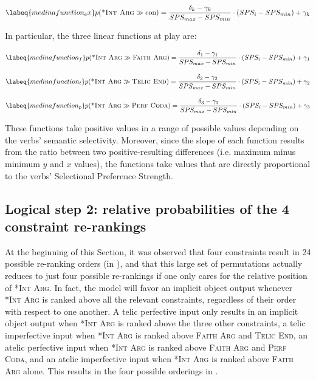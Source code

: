 \begin{equation} \labeq{medinafunction_ex}
p(\textsc{*Int Arg} \gg \textrm{con}) = \frac{\delta_k - \gamma_k}{SPS_{max} - SPS_{min}} \cdot ({SPS_{i} - SPS_{min}}) + \gamma_k
\end{equation}

In particular, the three linear functions at play are:

\begin{equation} \labeq{medinafunction_f}
p(\textsc{*Int Arg} \gg \textsc{Faith Arg}) = \frac{\delta_1 - \gamma_1}{SPS_{max} - SPS_{min}} \cdot ({SPS_{i} - SPS_{min}}) + \gamma_1
\end{equation}

\begin{equation} \labeq{medinafunction_t}
p(\textsc{*Int Arg} \gg \textsc{Telic End}) = \frac{\delta_2 - \gamma_2}{SPS_{max} - SPS_{min}} \cdot ({SPS_{i} - SPS_{min}}) + \gamma_2
\end{equation}

\begin{equation} \labeq{medinafunction_p}
p(\textsc{*Int Arg} \gg \textsc{Perf Coda}) = \frac{\delta_3 - \gamma_3}{SPS_{max} - SPS_{min}} \cdot ({SPS_{i} - SPS_{min}}) + \gamma_3
\end{equation}

These functions take positive values in a range of possible values depending on the verbs' semantic selectivity. Moreover, since the slope of each function results from the ratio between two positive-resulting differences (i.e. maximum minus minimum $y$ and $x$ values), the functions take values that are directly proportional to the verbs' Selectional Preference Strength.

\subsection{Logical step 2: relative probabilities of the 4 constraint re-rankings} 
At the beginning of this Section, it was observed that four constraints result in 24 possible re-ranking orders (in ), and that this large set of permutations actually reduces to just four possible re-rankings if one only cares for the relative position of \textsc{*Int Arg}. In fact, the model will favor an implicit object output whenever \textsc{*Int Arg} is ranked above all the relevant constraints, regardless of their order with respect to one another. A telic perfective input only results in an implicit object output when \textsc{*Int Arg} is ranked above the three other constraints, a telic imperfective input when \textsc{*Int Arg} is ranked above \textsc{Faith Arg} and \textsc{Telic End}, an atelic perfective input when \textsc{*Int Arg} is ranked above \textsc{Faith Arg} and \textsc{Perf Coda}, and an atelic imperfective input when \textsc{*Int Arg} is ranked above \textsc{Faith Arg} alone. This results in the four possible orderings in .

